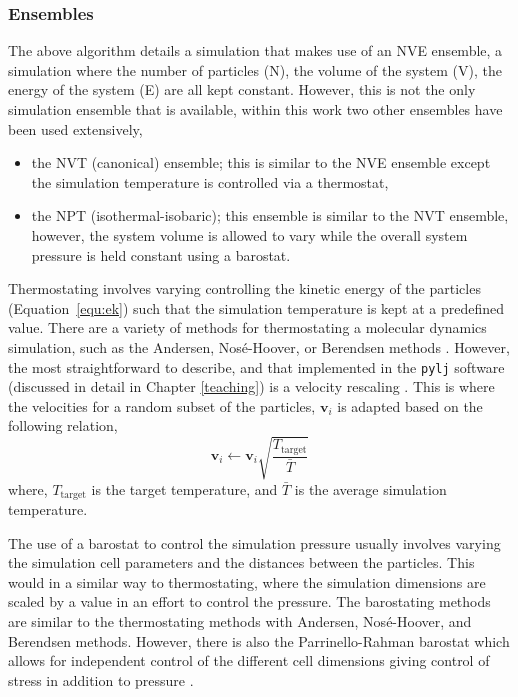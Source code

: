 \subsubsection{Ensembles}
The above algorithm details a simulation that makes use of an NVE ensemble, a simulation where the number of particles (N), the volume of the system (V), the energy of the system (E) are all kept constant.
However, this is not the only simulation ensemble that is available, within this work two other ensembles have been used extensively,
%
\begin{itemize}
\item the NVT (canonical) ensemble; this is similar to the NVE ensemble except the simulation temperature is controlled via a thermostat,
\item the NPT (isothermal-isobaric); this ensemble is similar to the NVT ensemble, however, the system volume is allowed to vary while the overall system pressure is held constant using a barostat.
\end{itemize}
%
Thermostating involves varying controlling the kinetic energy of the particles (Equation~\ref{equ:ek}) such that the simulation temperature is kept at a predefined value.
There are a variety of methods for thermostating a molecular dynamics simulation, such as the Andersen, Nos\'{e}-Hoover, or Berendsen methods \cite{andersen_molecular_1980,nose_unified_1984,berendsen_molecular_1984,hoover_canonical_1985}.
However, the most straightforward to describe, and that implemented in the \texttt{pylj} software (discussed in detail in Chapter \ref{teaching}) \cite{mccluskey_pylj_2018,mccluskey_arm61/pylj_2018} is a velocity rescaling \cite{bussi_canonical_2007}.
This is where the velocities for a random subset of the particles, $\mathbf{v}_i$ is adapted based on the following relation,
%
\begin{equation}
\mathbf{v}_i \leftarrow \mathbf{v}_i \sqrt{\frac{T_{\text{target}}}{\bar{T}}}
\end{equation}
%
where, $T_{\text{target}}$ is the target temperature, and $\bar{T}$ is the average simulation temperature.

The use of a barostat to control the simulation pressure usually involves varying the simulation cell parameters and the distances between the particles.
This would in a similar way to thermostating, where the simulation dimensions are scaled by a value in an effort to control the pressure.
The barostating methods are similar to the thermostating methods with Andersen, Nos\'{e}-Hoover, and Berendsen methods.
However, there is also the Parrinello-Rahman barostat which allows for independent control of the different cell dimensions giving control of stress in addition to pressure \cite{parrinello_polymorphic_1981}.
